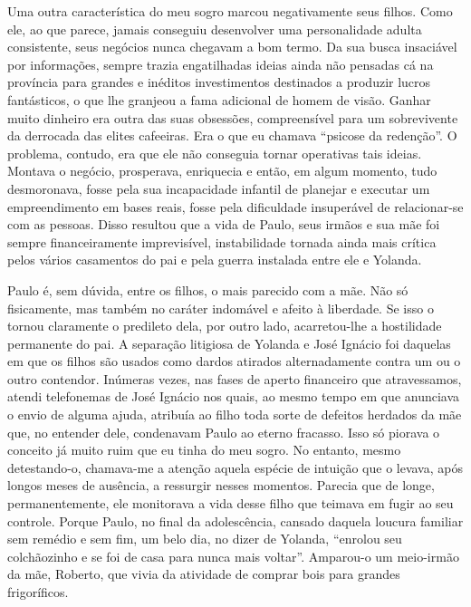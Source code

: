 Uma outra característica do meu sogro marcou negativamente seus filhos.
Como ele, ao que parece, jamais conseguiu desenvolver uma personalidade adulta consistente, seus negócios nunca chegavam a bom termo.
Da sua busca insaciável por informações, sempre trazia engatilhadas ideias ainda não pensadas cá na província para grandes e inéditos investimentos destinados a produzir lucros fantásticos, o que lhe granjeou a fama adicional de homem de visão.
Ganhar muito dinheiro era outra das suas obsessões, compreensível para um sobrevivente da derrocada das elites cafeeiras.
Era o que eu chamava ``psicose da redenção''.
O problema, contudo, era que ele não conseguia tornar operativas tais ideias.
Montava o negócio, prosperava, enriquecia e então, em algum momento, tudo desmoronava, fosse pela sua incapacidade infantil de planejar e executar um empreendimento em bases reais, fosse pela dificuldade insuperável de relacionar-se com as pessoas.
Disso resultou que a vida de Paulo, seus irmãos e sua mãe foi sempre financeiramente imprevisível, instabilidade tornada ainda mais crítica pelos vários casamentos do pai e pela guerra instalada entre ele e Yolanda.


Paulo é, sem dúvida, entre os filhos, o mais parecido com a mãe.
Não só fisicamente, mas também no caráter indomável e afeito à liberdade.
Se isso o tornou claramente o predileto dela, por outro lado, acarretou-lhe a hostilidade permanente do pai.
A separação litigiosa de Yolanda e José Ignácio foi daquelas em que os filhos são usados como dardos atirados alternadamente contra um ou o outro contendor.
Inúmeras vezes, nas fases de aperto financeiro que atravessamos, atendi telefonemas de José Ignácio nos quais, ao mesmo tempo em que anunciava o envio de alguma ajuda, atribuía ao filho toda sorte de defeitos herdados da mãe que, no entender dele, condenavam Paulo ao eterno fracasso.
Isso só piorava o conceito já muito ruim que eu tinha do meu sogro.
No entanto, mesmo detestando-o, chamava-me a atenção aquela espécie de intuição que o levava, após longos meses de ausência, a ressurgir nesses momentos.
Parecia que de longe, permanentemente, ele monitorava a vida desse filho que teimava em fugir ao seu controle.
Porque Paulo, no final da adolescência, cansado daquela loucura familiar sem remédio e sem fim, um belo dia, no dizer de Yolanda, ``enrolou seu colchãozinho e se foi de casa para nunca mais voltar''.
Amparou-o um meio-irmão da mãe, Roberto, que vivia da atividade de comprar bois para grandes frigoríficos.


